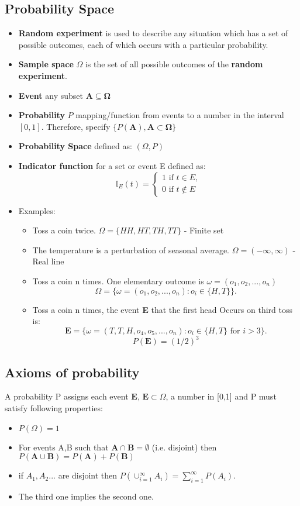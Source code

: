 \documentclass[12pt]{article}
\begin{document}
\subsection{Probability Space}
\begin{itemize}
\item \textbf{Random experiment} is used to describe any situation which has a set of possible outcomes, each of which occurs with a particular probability.
\item \textbf{Sample space} $\Omega$ is the set of all possible outcomes of the \textbf{random experiment}. 
\item \textbf{Event} any subset $\mathbf{A\subseteq\Omega}$   
\item \textbf{Probability} $P$ mapping/function from events to a number in the interval $[0,1]$. Therefore, specify $\{P\mathbf{(A),A\subset\Omega\}}$  
\item \textbf{Probability Space} defined as: $(\Omega , P)$ 
\item \textbf{Indicator function} for a set or event E defined as:
\[ \mathbb{I}_E(t)= \left\{
\begin{array}{ll}
1 \textrm{ if } t \in E ,\\
0 \textrm{ if } t \not\in E

\end{array}
\right.
\]

\item Examples:
\begin{itemize}
\item Toss a coin twice.  $\Omega = \{HH,HT,TH,TT\}$ - Finite set
\item The temperature is a perturbation of seasonal average.  $\Omega = (-\infty , \infty)$ - Real line 
\item Toss a coin n times. One elementary outcome is $\omega = (o_1,o_2,...,o_n)$
$$\Omega = \{\omega = (o_1,o_2,...,o_n):o_i \in \{ H,T\} \}.$$
\item Toss a coin n times, the event \textbf{E} that the first head Occurs on third toss is:
$$\mathbf{E} = \{\omega = (T,T,H,o_4,o_5,...,o_n):o_i \in \{ H,T\} \textrm{ for } i>3 \}.$$
$$P(\mathbf{E}) = (1/2)^3$$
\end{itemize}
\end{itemize}

\subsection{Axioms of probability}
A probability P assigns each event $\mathbf{E}$, $\mathbf{E} \subset  \Omega$, a number in [0,1] and P must satisfy following properties:
\begin{itemize}
\item $P(\Omega) = 1$
\item For events A,B such that $\mathbf{A \cap B = \emptyset}$ (i.e. disjoint) then $P(\mathbf{A \cup B}) = P(\mathbf{A}) + P(\mathbf{B})$
\item if $A_1,A_2...$ are disjoint then $P(\cup_{i=1}^\infty A_i) = \sum_{i=1}^\infty P(A_i)$.
\item The third one implies the second one.
\end{itemize}
\end{document}
